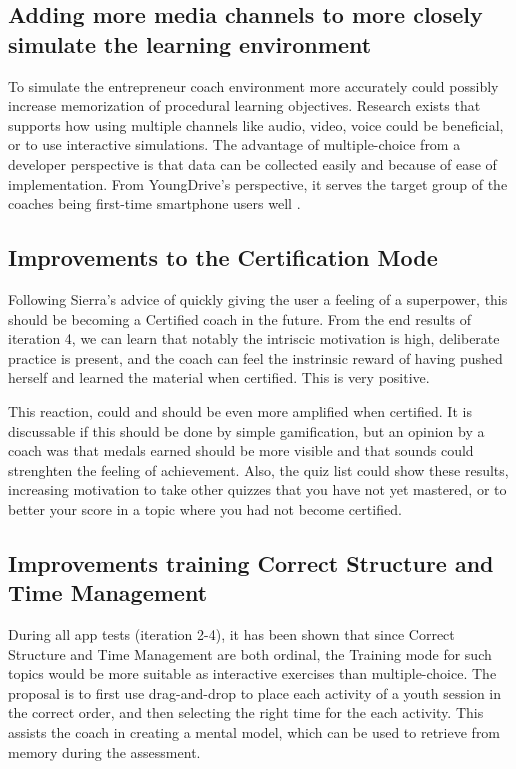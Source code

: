 \subsection{Adding more media channels to more closely simulate the learning environment}
To simulate the entrepreneur coach environment more accurately could possibly increase memorization of procedural learning objectives. Research exists that supports how using multiple channels like audio, video, voice could be beneficial, or to use interactive simulations.  The advantage of multiple-choice from a developer perspective is that data can be collected easily and because of ease of implementation. From YoungDrive's perspective, it serves the target group of the coaches being first-time smartphone users well \citep{youngdrive-masterthesis-idea}.

\subsection{Improvements to the Certification Mode}

Following Sierra's advice of quickly giving the user a feeling of a superpower, this should be becoming a Certified coach in the future. From the end results of iteration 4, we can learn that notably the intriscic motivation is high, deliberate practice is present, and the coach can feel the instrinsic reward of having pushed herself and learned the material when certified. This is very positive.

This reaction, could and should be even more amplified when certified. It is discussable if this should be done by simple gamification, but an opinion by a coach was that medals earned should be more visible and that sounds could strenghten the feeling of achievement. Also, the quiz list could show these results, increasing motivation to take other quizzes that you have not yet mastered, or to better your score in a topic where you had not become certified.

\subsection{Improvements training Correct Structure and Time Management}
During all app tests (iteration 2-4), it has been shown that since Correct Structure and Time Management are both ordinal, the Training mode for such topics would be more suitable as interactive exercises than multiple-choice. The proposal is to first use drag-and-drop to place each activity of a youth session in the correct order, and then selecting the right time for the each activity. This assists the coach in creating a mental model, which can be used to retrieve from memory during the assessment.

